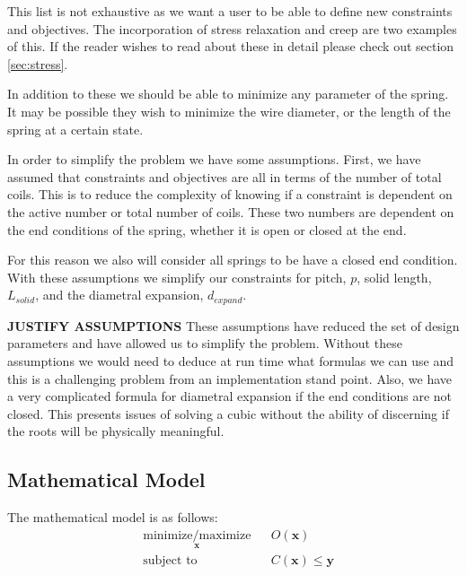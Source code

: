 \documentclass[10pt]{article}
\begin{document}
This list is not exhaustive as we want a user to be able to define new constraints and objectives. The incorporation of stress relaxation and creep are two examples of this. If the reader wishes to read about these in detail please check out section \ref{sec:stress}. 

In addition to these we should be able to minimize any parameter of the spring. It may be possible they wish to minimize the wire diameter, or the length of the spring at a certain state.  

In order to simplify the problem we have some assumptions. First, we have assumed that constraints and objectives are all in terms of the number of total coils. This is to reduce the complexity of knowing if a constraint is dependent on the active number or total number of coils. These two numbers are dependent on the end conditions of the spring, whether it is open or closed at the end. 

For this reason we also will consider all springs to be have a closed end condition. With these assumptions we simplify our constraints for pitch, $p$, solid length, $L_{solid}$, and the diametral expansion, $d_{expand}$.

\textbf{JUSTIFY ASSUMPTIONS}
These assumptions have reduced the set of design parameters and have allowed us to simplify the problem. Without these assumptions we would need to deduce at run time what formulas we can use and this is a challenging problem from an implementation stand point. Also, we have a very complicated formula for diametral expansion if the end conditions are not closed. This presents issues of solving a cubic without the ability of discerning if the roots will be physically meaningful. 


\subsection{Mathematical Model}
			
			The mathematical model is as follows: 
				\begin{equation*}
 					\begin{aligned}
 						& \underset{\textbf{x}}{\text{minimize/maximize}}
 						& & O(\textbf{x}) \\
 						& \text{subject to}
 						& & C(\textbf{x}) \le \textbf{y}
 					\end{aligned}
				\end{equation*}
\end{document}
